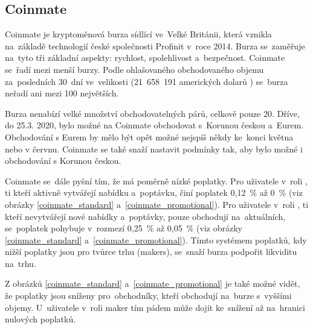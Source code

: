 \documentclass[thesis=B,czech]{FITthesis}[2019/03/21]
\begin{document}
\subsection{Coinmate}
Coinmate je kryptoměnová burza sídlící ve~Velké Británii, která vznikla \linebreak na~základě technologií české společnosti Profinit v~roce 2014. Burza se~zaměřuje na~tyto tři základní aspekty: rychlost, spolehlivost a~bezpečnost. Coinmate se~řadí mezi menší burzy. Podle ohlašovaného obchodovaného objemu za~posledních 30~dní ve~velikosti (21~658~191 amerických dolarů \cite{coin360}) se~burza neřadí ani mezi 100 největších. \cite{coinmarketcap, coinmate_blog} 

Burza nenabízí velké množství obchodovatelných párů, celkově pouze 20. Dříve, do 25.3. 2020, bylo možné na Coinmate obchodovat s~Korunou českou a~Eurem. Obchodování s Eurem by mělo být opět možné nejspíš někdy ke~konci května nebo v červnu. Coinmate se také snaží nastavit podmínky tak, aby bylo možné i obchodování s Korunou českou. \cite{coinmate_blog}  

Coinmate se~dále pyšní tím, že má poměrně nízké poplatky. Pro uživatele v~roli , ti kteří aktivně vytvářejí nabídku a~poptávku, činí poplatek 0,12~\% až 0~\% (viz obrázky \ref{coinmate_standard} a~\ref{coinmate_promotional}). Pro uživatele v~roli , ti kteří nevytvářejí nové nabídky a~poptávky, pouze obchodují na~aktuálních, se~poplatek pohybuje v~rozmezí 0,25~\% až 0,05~\% (viz obrázky \ref{coinmate_standard} a~\ref{coinmate_promotional}). Tímto systémem poplatků, kdy nižší poplatky jsou pro tvůrce trhu (makers), se~snaží burza podpořit likviditu na~trhu. \cite{cryptowisser_coinmate} \cite{coinmate_fees}

Z obrázků \ref{coinmate_standard} a~\ref{coinmate_promotional} je také možné vidět, že poplatky jsou sníženy pro~obchodníky, kteří obchodují na~burze s~vyššími objemy. U~uživatele v~roli maker tím pádem může dojít ke~snížení až na~hranici nulových poplatků. \cite{coinmate_fees}
\end{document}
